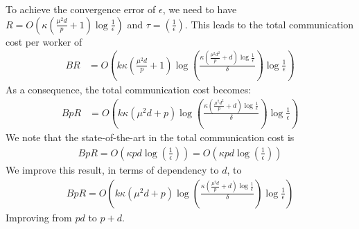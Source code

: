 \begin{corollary}
To achieve the convergence error of $\epsilon$, we need to have $R=O\left(\kappa(\frac{\mu^2d}{p}+1)\log\frac{1}{\epsilon}\right)$ and $\tau=\left(\frac{1}{\epsilon}\right)$. This leads to the total communication cost per worker of 
\begin{align}
BR&=O\left(k\kappa(\frac{\mu^2d}{p}+1)\log\left(\frac{\kappa(\frac{\mu^2d^2}{p}+d)\log\frac{1}{\epsilon}}{\delta}\right)\log\frac{1}{\epsilon} \right)
\end{align}
As a consequence, the total communication cost becomes:
\begin{align}
BpR&=O\left(k\kappa(\mu^2d+p)\log\left(\frac{\kappa(\frac{\mu^2d^2}{p}+d)\log\frac{1}{\epsilon}}{\delta}\right)\log\frac{1}{\epsilon} \right)
\end{align}
We note that the state-of-the-art in \cite{karimireddy2019scaffold} the total communication cost is 
\begin{align}
    BpR=O\left(\kappa pd\log\left(\frac{1}{\epsilon}\right) \right)=O\left(\kappa pd\log\left(\frac{1}{\epsilon}\right)\right) 
\end{align}
We improve this result, in terms of dependency to $d$, to 
\begin{align}
    BpR=O\left(k\kappa(\mu^2d+p)\log\left(\frac{\kappa(\frac{\mu^2d}{p}+d)\log\frac{1}{\epsilon}}{\delta}\right)\log\frac{1}{\epsilon} \right)
\end{align}
Improving from $pd$ to $p+d$.
\end{corollary}





